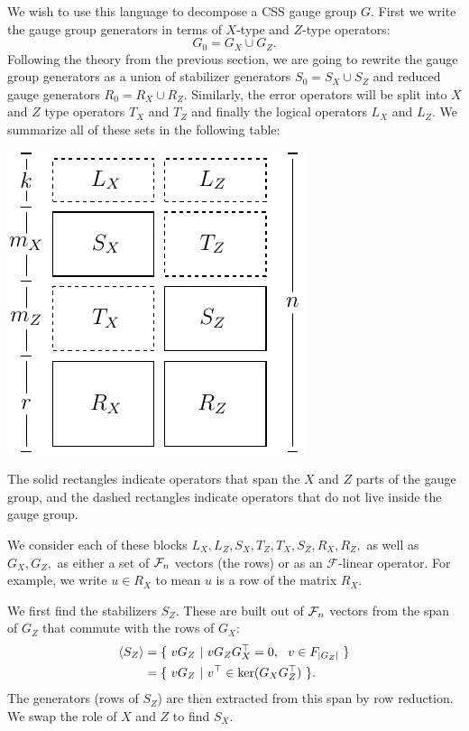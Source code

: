 \documentclass[12pt]{article}
\newcommand{\Field}{\mathcal{F}}
\def\Ker{\mathrm{ker}}
\begin{document}
We wish to use this language to decompose a CSS gauge group $G.$
First we write the gauge group generators in terms of
$X$-type and $Z$-type operators:
$$
    G_0 = G_X \cup G_Z.
$$
Following the theory from the previous section,
we are going to rewrite the gauge group generators
as a union of stabilizer generators $S_0 = S_X \cup S_Z$
and reduced gauge generators $R_0 = R_X \cup R_Z.$
Similarly, the error operators
will be split into $X$ and $Z$ type
operators $T_X$ and $T_Z$ and
finally the logical operators
$L_X$ and $L_Z.$
We summarize all of these sets
in the following table:
\begin{center}
\includegraphics[]{pic-symplectic.pdf}
\end{center}
The solid rectangles indicate operators that
span the $X$ and $Z$ parts of the gauge group,
and the dashed rectangles indicate operators that
do not live inside the gauge group.

We consider each of these blocks 
$L_X, L_Z, S_X, T_Z, T_X, S_Z, R_X, R_Z,$
as well as $G_X,G_Z,$
as either a set of $\Fnd$ vectors (the rows) or as an 
$\Field$-linear operator.
For example, we write $u\in R_X$ to mean $u$ is 
a row of the matrix $R_X$.

We first find the stabilizers $S_Z$.
These are built out of $\Fnd$ vectors from the span of $G_Z$
that commute with the rows of $G_X:$
\begin{align*}
    \Span{S_Z} &= \{\  vG_Z \ |\  v G_Z G_X^\top = 0, \ \ v \in F_{|G_Z|}\ \} \\
               &= \{\  vG_Z \ |\  v^\top \in \Ker(G_X G_Z^\top)  \ \}.
\end{align*}
The generators (rows of $S_Z$) are then extracted
from this span by row reduction.
We swap the role of $X$ and $Z$ to find $S_X.$
\end{document}
